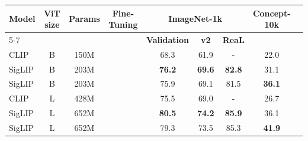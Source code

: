 \documentclass[11pt]{article}
\newcommand{\benchmark}{Concept-10k}
\newcommand{\cmark}{\ding{51}} %
\newcommand{\xmark}{\ding{55}}
\begin{document}
\begin{table}[t]
\centering
\begin{tabular}{lcccccccc}
    \toprule
    \textbf{Model} & \textbf{ViT size} & \textbf{Params} & \textbf{Fine-Tuning} & \multicolumn{3}{c}{\textbf{ImageNet-1k}} & \textbf{\benchmark} \\
    \cmidrule(lr){5-7} 
    & & & & \textbf{Validation} & \textbf{v2} & \textbf{ReaL} &  \\
    \midrule
    CLIP & B & 150M & \xmark  & 68.3 & 61.9 & - & 22.0 \\
    SigLIP & B & 203M & \xmark  & \textbf{76.2} & \textbf{69.6} & \textbf{82.8} & 31.1 \\
    SigLIP & B & 203M & \cmark & 75.9 & 69.1 & 81.5 & \textbf{36.1} \\
    \midrule
    CLIP & L & 428M & \xmark  & 75.5 & 69.0 & - & 26.7 \\
    SigLIP & L & 652M & \xmark  & \textbf{80.5} & \textbf{74.2} &\textbf{85.9} & 36.1 \\
    SigLIP & L & 652M & \cmark & 79.3 & 73.5 & 85.3 & \textbf{41.9} \\
    \midrule

\end{tabular}
\end{table}
\end{document}
